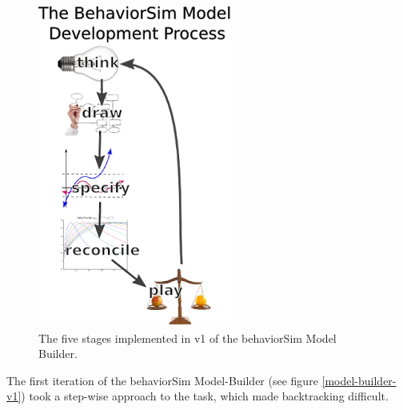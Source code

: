 \documentclass[conference]{IEEEtran}
\begin{document}
\begin{figure}[!t]
  \centering
  \includegraphics[width=0.5\columnwidth]{img/behaviorSim_process}  
  \caption{The five stages implemented in v1 of the behaviorSim Model Builder.}
  \label{model-builder-stages}
\end{figure}
  
The first iteration of the behaviorSim Model-Builder (see figure \ref{model-builder-v1}) took a step-wise approach to the task, which made backtracking difficult.
\end{document}
